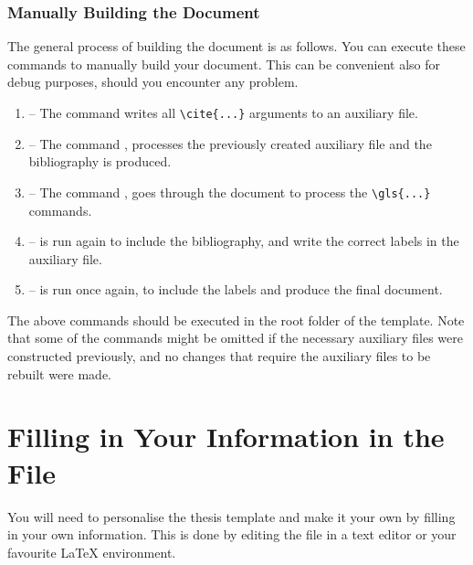 \subsubsection*{Manually Building the Document}

The general process of building the document is as follows. You can execute these commands to manually build your document. This can be convenient also for debug purposes, should you encounter any problem.

\begin{enumerate}
  \item {} -- The command  writes all \verb|\cite{...}| arguments to an auxiliary file.

  \item {} -- The command , processes the previously created auxiliary file and the bibliography is produced.

  \item {} -- The command , goes through the document to process the \verb|\gls{...}| commands.

  \item {} --  is run again to include the bibliography, and write the correct labels in the auxiliary file.

  \item {} --  is run once again, to include the labels and produce the final document.
\end{enumerate}

The above commands should be executed in the root folder of the template. Note that some of the commands might be omitted if the necessary auxiliary files were constructed previously, and no changes that require the auxiliary files to be rebuilt were made.


\section{Filling in Your Information in the  File}\label{FillingFile}

You will need to personalise the thesis template and make it your own by filling in your own information. This is done by editing the  file in a text editor or your favourite LaTeX environment.

